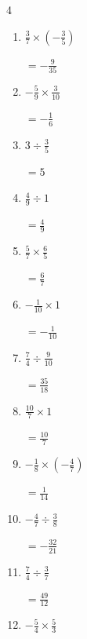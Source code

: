 \begin{multicols}{4}
\begin{enumerate}
        $\displaystyle =-\frac{1}{3}$

  \item $\displaystyle \frac{3}{7}\times{}\left(-\frac{3}{5}\right)$

        $\displaystyle =-\frac{9}{35}$

  \item $\displaystyle -\frac{5}{9}\times{}\frac{3}{10}$

        $\displaystyle =-\frac{1}{6}$

  \item $\displaystyle 3\div{}\frac{3}{5}$

        $\displaystyle =5$

  \item $\displaystyle \frac{4}{9}\div{}1$

        $\displaystyle =\frac{4}{9}$

  \item $\displaystyle \frac{5}{7}\times{}\frac{6}{5}$

        $\displaystyle =\frac{6}{7}$

  \item $\displaystyle -\frac{1}{10}\times{}1$

        $\displaystyle =-\frac{1}{10}$

  \item $\displaystyle \frac{7}{4}\div{}\frac{9}{10}$

        $\displaystyle =\frac{35}{18}$

\columnbreak %

  \item $\displaystyle \frac{10}{7}\times{}1$

        $\displaystyle =\frac{10}{7}$

  \item $\displaystyle -\frac{1}{8}\times{}\left(-\frac{4}{7}\right)$

        $\displaystyle =\frac{1}{14}$

  \item $\displaystyle -\frac{4}{7}\div{}\frac{3}{8}$

        $\displaystyle =-\frac{32}{21}$

  \item $\displaystyle \frac{7}{4}\div{}\frac{3}{7}$

        $\displaystyle =\frac{49}{12}$

  \item $\displaystyle -\frac{5}{4}\times{}\frac{5}{3}$


\end{enumerate}
\end{multicols}
